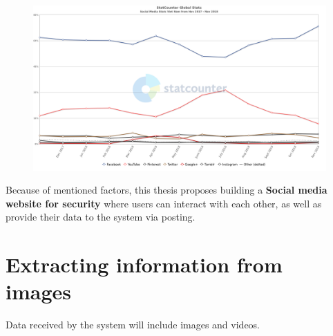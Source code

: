 \begin{center}
    \begin{figure}[H]
    \centering
    \includegraphics[width=1\columnwidth]{images/chap3/social_media_vn.png}
    \label{chap3:social_media_vn}
    \end{figure}
\end{center}
Because of mentioned factors, this thesis proposes building a \textbf{Social media website for security} where users can interact with each other, as well as provide their data to the system via posting.
\section{Extracting information from images}

Data received by the system will include images and videos. %
 
